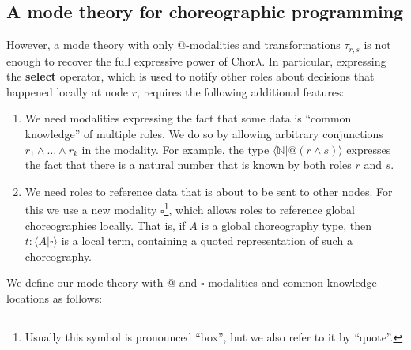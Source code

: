 \documentclass{scrartcl}
\theoremstyle{definition}
\theoremstyle{plain}
\begin{document}
\subsection{A mode theory for choreographic programming}

However, a mode theory with only $@$-modalities and transformations $\tau_{r,s}$
is not enough to recover the full expressive power of
Chor$\lambda$. In particular, expressing the \textbf{select} operator, which is
used to notify other roles about decisions that happened locally at node $r$,
requires the following additional features:
\begin{enumerate}
\item We
  need modalities expressing the fact that some data is ``common knowledge'' of
  multiple roles. We do so by allowing arbitrary conjunctions $r_1 \land \ldots
  \land r_k$ in the modality. For example, the type $\langle \mathbb{N} |
  @(r\land s) \rangle$ expresses the fact that there is a natural number that is
  known by both roles $r$ and $s$.
\item We need roles to reference data that is about to be sent to other
  nodes. For this we use a new modality $\square$\footnote{Usually this symbol
    is pronounced ``box'', but we also refer to it by ``quote''.}, which allows roles to
  reference global choreographies locally. That is, if $A$
  is a global choreography type, then $t : \langle A | \square \rangle$ is a
  local term, containing a quoted representation of such a choreography.
\end{enumerate}
We define our mode theory with $@$ and $\square$ modalities and common knowledge
locations as follows:
\end{document}
